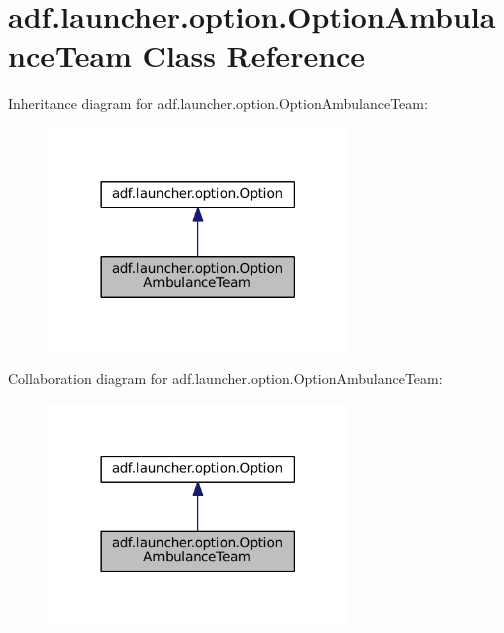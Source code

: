\hypertarget{classadf_1_1launcher_1_1option_1_1OptionAmbulanceTeam}{}\section{adf.\+launcher.\+option.\+Option\+Ambulance\+Team Class Reference}
\label{classadf_1_1launcher_1_1option_1_1OptionAmbulanceTeam}


Inheritance diagram for adf.\+launcher.\+option.\+Option\+Ambulance\+Team\+:
\nopagebreak
\begin{figure}[H]
\begin{center}
\leavevmode
\includegraphics[width=225pt]{classadf_1_1launcher_1_1option_1_1OptionAmbulanceTeam__inherit__graph}
\end{center}
\end{figure}


Collaboration diagram for adf.\+launcher.\+option.\+Option\+Ambulance\+Team\+:
\nopagebreak
\begin{figure}[H]
\begin{center}
\leavevmode
\includegraphics[width=225pt]{classadf_1_1launcher_1_1option_1_1OptionAmbulanceTeam__coll__graph}
\end{center}
\end{figure}
